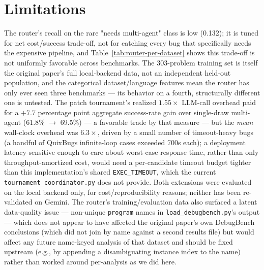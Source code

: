 \documentclass[conference]{IEEEtran}
\begin{document}
\section{Limitations}
The router's recall on the rare "needs multi-agent" class is low (0.132); it is tuned for net cost/success trade-off, not for catching every bug that specifically needs the expensive pipeline, and Table~\ref{tab:router-per-dataset} shows this trade-off is not uniformly favorable across benchmarks. The 303-problem training set is itself the original paper's full local-backend data, not an independent held-out population, and the categorical dataset/language features mean the router has only ever seen three benchmarks — its behavior on a fourth, structurally different one is untested. The patch tournament's realized $1.55\times$ LLM-call overhead paid for a $+7.7$ percentage point aggregate success-rate gain over single-draw multi-agent (61.8\% $\to$ 69.5\%) — a favorable trade by that measure — but the \emph{mean} wall-clock overhead was $6.3\times$, driven by a small number of timeout-heavy bugs (a handful of QuixBugs infinite-loop cases exceeded 700s each); a deployment latency-sensitive enough to care about worst-case response time, rather than only throughput-amortized cost, would need a per-candidate timeout budget tighter than this implementation's shared \texttt{EXEC\_TIMEOUT}, which the current \texttt{tournament\_coordinator.py} does not provide. Both extensions were evaluated on the local backend only, for cost/reproducibility reasons; neither has been re-validated on Gemini. The router's training/evaluation data also surfaced a latent data-quality issue — non-unique \texttt{program} names in \texttt{load\_debugbench.py}'s output — which does not appear to have affected the original paper's own DebugBench conclusions (which did not join by name against a second results file) but would affect any future name-keyed analysis of that dataset and should be fixed upstream (e.g., by appending a disambiguating instance index to the name) rather than worked around per-analysis as we did here.

\end{document}
